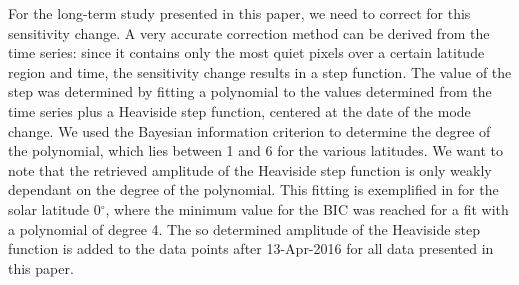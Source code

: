 \documentclass{aa}
\begin{document}
For the long-term study presented in this paper, we need to correct for this sensitivity change. A very accurate correction method can be derived from the \inw{} time series: since it contains only the most quiet pixels over a certain latitude region and time, the sensitivity change results in a step function. The value of the step was determined by fitting a polynomial to the \brms{} values determined from the \inw{} time series plus a Heaviside step function, centered at the date of the mode change. We used the Bayesian information criterion \cite[BIC,][]{Stoica2004} to determine the degree of the polynomial, which lies between 1 and 6 for the various latitudes. We want to note that the retrieved amplitude of the Heaviside step function is only weakly dependant on the degree of the polynomial. This fitting is exemplified in  for the solar latitude 0$^\circ$, where the minimum value for the BIC was reached for a fit with a polynomial of degree 4. The so determined amplitude of the Heaviside step function is added to the data points after 13-Apr-2016 for all data presented in this paper.







\end{document}

